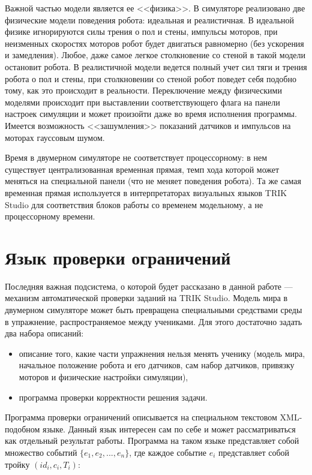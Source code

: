 \documentclass[a5paper]{article}
\begin{document}
Важной частью модели является ее <<физика>>. В симуляторе реализовано две физические модели поведения робота: идеальная и реалистичная. В идеальной физике игнорируются силы трения о пол и стены, импульсы моторов, при неизменных скоростях моторов робот будет двигаться равномерно (без ускорения и замедления). Любое, даже самое легкое столкновение со стеной в такой модели остановит робота. В реалистичной модели ведется полный учет сил тяги и трения робота о пол и стены, при столкновении со стеной робот поведет себя подобно тому, как это происходит в реальности. Переключение между физическими моделями происходит при выставлении соответствующего флага на панели настроек симуляции и может произойти даже во время исполнения программы. Имеется возможность <<зашумления>> показаний датчиков и импульсов на моторах гауссовым шумом.

Время в двумерном симуляторе не соответствует процессорному: в нем существует централизованная временная прямая, темп хода которой может меняться на специальной панели (что не меняет поведения робота). Та же самая временная прямая используется в интерпретаторах визуальных языков TRIK Studio для соответствия блоков работы со временем модельному, а не процессорному времени.

\section{Язык проверки ограничений}
\label{chapter:constraintsChecker}

Последняя важная подсистема, о которой будет рассказано в данной работе --- механизм автоматической проверки заданий на TRIK Studio. Модель мира в двумерном симуляторе может быть превращена специальными средствами среды в упражнение, распространяемое между учениками. Для этого достаточно задать два набора описаний:

\begin{itemize}
    \item описание того, какие части упражнения нельзя менять ученику (модель мира, начальное положение робота и его датчиков, сам набор датчиков, привязку моторов и физические настройки симуляции),
    \item программа проверки корректности решения задачи.
\end{itemize}

Программа проверки ограничений описывается на специальном текстовом XML-подобном языке. Данный язык интересен сам по себе и может рассматриваться как отдельный результат работы. Программа на таком языке представляет собой множество событий $\{ e_1, e_2, ..., e_n \}$, где каждое событие 
$e_i$ представляет собой тройку $(id_i, c_i, T_i)$:
\end{document}
